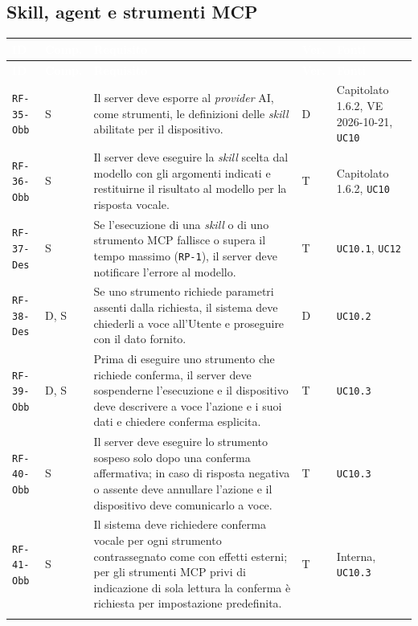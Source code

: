 \documentclass[12pt,a4paper]{article}
\newcommand{\thc}[1]{\textcolor{white}{\textbf{#1}}}
\newcommand{\rl}{\\ \arrayrulecolor{bfline}\hline}
\begin{document}
\subsection{Skill, agent e strumenti MCP}
\begin{longtable}{>{\raggedright\arraybackslash}p{}>{\centering\arraybackslash}p{}>{\raggedright\arraybackslash}p{}>{\centering\arraybackslash}p{}>{\raggedright\arraybackslash}p{}}
\rowcolor{bfblue}\thc{ID} & \thc{Comp.} & \thc{Requisito} & \thc{Ver.} & \thc{Fonti} \\ \endfirsthead
\rowcolor{bfblue}\thc{ID} & \thc{Comp.} & \thc{Requisito} & \thc{Ver.} & \thc{Fonti} \\ \endhead
\texttt{RF-35-Obb} & S & Il server deve esporre al \emph{provider} AI, come strumenti, le definizioni delle \emph{skill} abilitate per il dispositivo. & D & Capitolato 1.6.2, VE 2026-10-21, \texttt{UC10} \rl

\texttt{RF-36-Obb} & S & Il server deve eseguire la \emph{skill} scelta dal modello con gli argomenti indicati e restituirne il risultato al modello per la risposta vocale. & T & Capitolato 1.6.2, \texttt{UC10} \rl

\texttt{RF-37-Des} & S & Se l'esecuzione di una \emph{skill} o di uno strumento MCP fallisce o supera il tempo massimo (\texttt{RP-1}), il server deve notificare l'errore al modello. & T & \texttt{UC10.1}, \texttt{UC12} \rl

\texttt{RF-38-Des} & D, S & Se uno strumento richiede parametri assenti dalla richiesta, il sistema deve chiederli a voce all'Utente e proseguire con il dato fornito. & D & \texttt{UC10.2} \rl

\texttt{RF-39-Obb} & D, S & Prima di eseguire uno strumento che richiede conferma, il server deve sospenderne l'esecuzione e il dispositivo deve descrivere a voce l'azione e i suoi dati e chiedere conferma esplicita. & T & \texttt{UC10.3} \rl

\texttt{RF-40-Obb} & S & Il server deve eseguire lo strumento sospeso solo dopo una conferma affermativa; in caso di risposta negativa o assente deve annullare l'azione e il dispositivo deve comunicarlo a voce. & T & \texttt{UC10.3} \rl

\texttt{RF-41-Obb} & S & Il sistema deve richiedere conferma vocale per ogni strumento contrassegnato come con effetti esterni; per gli strumenti MCP privi di indicazione di sola lettura la conferma è richiesta per impostazione predefinita. & T & Interna, \texttt{UC10.3} \rl


\end{longtable}
\end{document}
